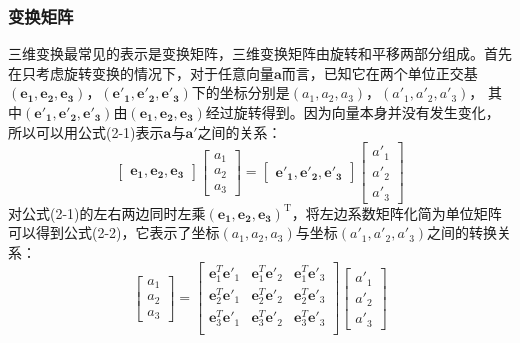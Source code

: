     \subsubsection{变换矩阵}
    三维变换最常见的表示是变换矩阵，三维变换矩阵由旋转和平移两部分组成。首先在只考虑旋转变换的情况下，对于任意向量$\mathbf{a}$而言，已知它在两个单位正交基$\mathbf{(e_1,e_2,e_3)}$，$\mathbf{(e'_1,e'_2,e'_3)}$下的坐标分别是$(a_1,a_2,a_3)$，$(a'_1,a'_2,a'_3)$， 其中$\mathbf{(e'_1,e'_2,e'_3)}$由$\mathbf{(e_1,e_2,e_3)}$经过旋转得到。因为向量本身并没有发生变化，所以可以用公式(2-1)表示$\mathbf{a}$与$\mathbf{a'}$之间的关系：
    \begin{equation}
        \begin{bmatrix}
            \mathbf{e_1},\mathbf{e_2},\mathbf{e_3}
        \end{bmatrix}
        \begin{bmatrix}
            a_1 \\ a_2 \\ a_3
        \end{bmatrix}
        =
        \begin{bmatrix}
            \mathbf{e'_1},\mathbf{e'_2},\mathbf{e'_3}
        \end{bmatrix}
        \begin{bmatrix}
            a'_1 \\ a'_2 \\ a'_3
        \end{bmatrix}
    \end{equation}
    对公式(2-1)的左右两边同时左乘$\mathbf{(e_1,e_2,e_3)}^\mathrm{T}$，将左边系数矩阵化简为单位矩阵可以得到公式(2-2)，它表示了坐标$(a_1,a_2,a_3)$与坐标$(a'_1,a'_2,a'_3)$之间的转换关系：
    \begin{equation}
        \begin{bmatrix}
            a_1 \\ a_2 \\ a_3
        \end{bmatrix}
        =
        \begin{bmatrix}
            \mathbf{e}^T_1 \mathbf{e}'_1 & \mathbf{e}^T_1 \mathbf{e}'_2 & \mathbf{e}^T_1 \mathbf{e}'_3\\
            \mathbf{e}^T_2 \mathbf{e}'_1 & \mathbf{e}^T_2 \mathbf{e}'_2 & \mathbf{e}^T_2 \mathbf{e}'_3\\
            \mathbf{e}^T_3 \mathbf{e}'_1 & \mathbf{e}^T_3 \mathbf{e}'_2 & \mathbf{e}^T_3 \mathbf{e}'_3\\
        \end{bmatrix}
        \begin{bmatrix}
            a'_1 \\ a'_2 \\ a'_3
        \end{bmatrix}
    \end{equation}
